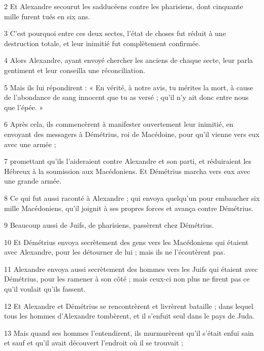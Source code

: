 \par 2 Et Alexandre secourut les sadducéens contre les pharisiens, dont cinquante mille furent tués en six ans.

\par 3 C'est pourquoi entre ces deux sectes, l'état de choses fut réduit à une destruction totale, et leur inimitié fut complètement confirmée.

\par 4 Alors Alexandre, ayant envoyé chercher les anciens de chaque secte, leur parla gentiment et leur conseilla une réconciliation.

\par 5 Mais ils lui répondirent : « En vérité, à notre avis, tu mérites la mort, à cause de l'abondance de sang innocent que tu as versé ; qu'il n'y ait donc entre nous que l'épée. »

\par 6 Après cela, ils commencèrent à manifester ouvertement leur inimitié, en envoyant des messagers à Démétrius, roi de Macédoine, pour qu'il vienne vers eux avec une armée ;

\par 7 promettant qu'ils l'aideraient contre Alexandre et son parti, et réduiraient les Hébreux à la soumission aux Macédoniens. Et Démétrius marcha vers eux avec une grande armée.

\par 8 Ce qui fut aussi raconté à Alexandre ; qui envoya quelqu'un pour embaucher six mille Macédoniens, qu'il joignit à ses propres forces et avança contre Démétrius.

\par 9 Beaucoup aussi de Juifs, de pharisiens, passèrent chez Démétrius.

\par 10 Et Démétrius envoya secrètement des gens vers les Macédoniens qui étaient avec Alexandre, pour les détourner de lui ; mais ils ne l'écoutèrent pas.

\par 11 Alexandre envoya aussi secrètement des hommes vers les Juifs qui étaient avec Démétrius, pour les ramener à son côté ; mais ceux-ci non plus ne firent pas ce qu'il voulait qu'ils fassent.

\par 12 Et Alexandre et Démétrius se rencontrèrent et livrèrent bataille ; dans lequel tous les hommes d'Alexandre tombèrent, et il s'enfuit seul dans le pays de Juda.

\par 13 Mais quand ses hommes l'entendirent, ils murmurèrent qu'il s'était enfui sain et sauf et qu'il avait découvert l'endroit où il se trouvait ;


